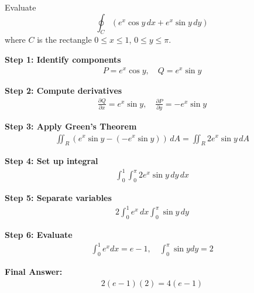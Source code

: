 \begin{examplebox}
    Evaluate
    \begin{equation*}
        \oint_C (e^x\cos y\,dx + e^x\sin y\,dy)
    \end{equation*}
    where $C$ is the rectangle $0 \le x \le 1$, $0 \le y \le \pi$.

    \textbf{Step 1: Identify components}
    \begin{align*}
        P = e^x \cos y, \quad Q = e^x \sin y
    \end{align*}

    \textbf{Step 2: Compute derivatives}
    \begin{align*}
        \frac{\partial Q}{\partial x} = e^x \sin y, \quad
        \frac{\partial P}{\partial y} = -e^x \sin y
    \end{align*}

    \textbf{Step 3: Apply Green's Theorem}
    \begin{align*}
        \iint_R (e^x \sin y - (-e^x \sin y))\, dA
        = \iint_R 2e^x \sin y\, dA
    \end{align*}

    \textbf{Step 4: Set up integral}
    \begin{align*}
        \int_0^1 \int_0^\pi 2e^x \sin y\, dy\, dx
    \end{align*}

    \textbf{Step 5: Separate variables}
    \begin{align*}
        2 \int_0^1 e^x\,dx \int_0^\pi \sin y\,dy
    \end{align*}

    \textbf{Step 6: Evaluate}
    \begin{align*}
        \int_0^1 e^x dx = e - 1, \quad
        \int_0^\pi \sin y dy = 2
    \end{align*}

    \textbf{Final Answer:}
    \begin{align*}
        2(e-1)(2) = \boxed{4(e-1)}
    \end{align*}
\end{examplebox}